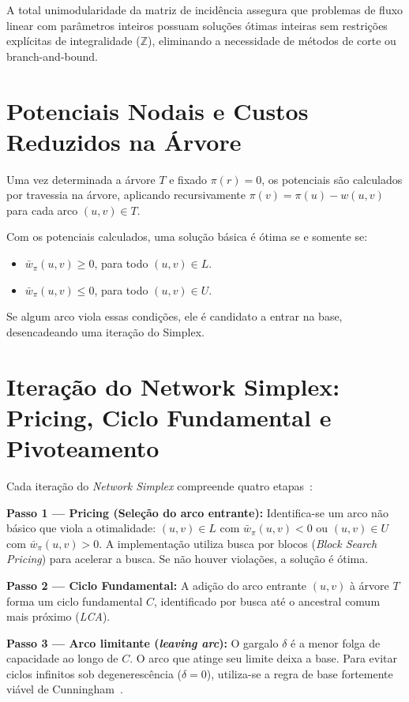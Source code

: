  A total unimodularidade da matriz de incidência assegura que problemas de fluxo linear com parâmetros inteiros possuam soluções ótimas inteiras sem restrições explícitas de integralidade ($\mathbb{Z}$), eliminando a necessidade de métodos de corte ou branch-and-bound.


\section{Potenciais Nodais e Custos Reduzidos na Árvore}

Uma vez determinada a árvore $T$ e fixado $\pi(r) = 0$, os potenciais são calculados por travessia na árvore, aplicando recursivamente $\pi(v) = \pi(u) - w(u,v)$ para cada arco $(u,v) \in T$.

Com os potenciais calculados, uma solução básica é ótima se e somente se:
\begin{itemize}
    \item $\bar{w}_\pi(u,v) \ge 0$, para todo $(u,v) \in L$.
    \item $\bar{w}_\pi(u,v) \le 0$, para todo $(u,v) \in U$.
\end{itemize}

Se algum arco viola essas condições, ele é candidato a entrar na base, desencadeando uma iteração do Simplex.


\section{Iteração do Network Simplex: Pricing, Ciclo Fundamental e Pivoteamento}

Cada iteração do \textit{Network Simplex} compreende quatro etapas~\cite{ahuja1993network, dantzig1951application}:

\textbf{Passo 1 --- Pricing (Seleção do arco entrante):}
Identifica-se um arco não básico que viola a otimalidade: $(u,v) \in L$ com $\bar{w}_\pi(u,v) < 0$ ou $(u,v) \in U$ com $\bar{w}_\pi(u,v) > 0$. A implementação utiliza busca por blocos (\textit{Block Search Pricing}) para acelerar a busca. Se não houver violações, a solução é ótima.

\textbf{Passo 2 --- Ciclo Fundamental:}
A adição do arco entrante $(u,v)$ à árvore $T$ forma um ciclo fundamental $C$, identificado por busca até o ancestral comum mais próximo (\textit{LCA}).

\textbf{Passo 3 --- Arco limitante (\textit{leaving arc}):}
O gargalo $\delta$ é a menor folga de capacidade ao longo de $C$. O arco que atinge seu limite deixa a base. Para evitar ciclos infinitos sob degenerescência ($\delta = 0$), utiliza-se a regra de base fortemente viável de Cunningham~\cite{cunningham1976network}.

